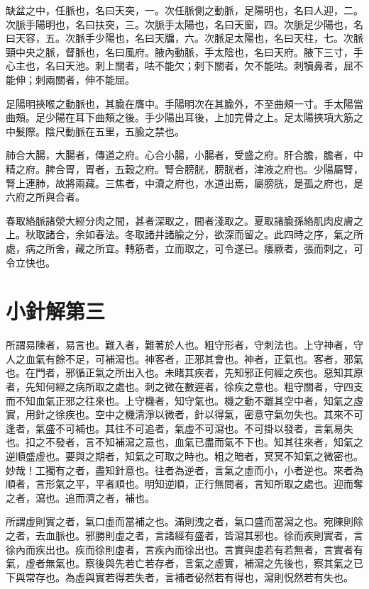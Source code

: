 缺盆之中，任脈也，名曰天突，一。次任脈側之動脈，足陽明也，名曰人迎，二。次脈手陽明也，名曰扶突，三。次脈手太陽也，名曰天窗，四。次脈足少陽也，名曰天容，五。次脈手少陽也，名曰天牖，六。次脈足太陽也，名曰天柱，七。次脈頸中央之脈，督脈也，名曰風府。腋內動脈，手太陰也，名曰天府。腋下三寸，手心主也，名曰天池。刺上關者，呿不能欠；刺下關者，欠不能呿。刺犢鼻者，屈不能伸；刺兩關者，伸不能屈。

足陽明挾喉之動脈也，其腧在膺中。手陽明次在其腧外，不至曲頰一寸。手太陽當曲頰。足少陽在耳下曲頰之後。手少陽出耳後，上加完骨之上。足太陽挾項大筋之中髮際。陰尺動脈在五里，五腧之禁也。

肺合大腸，大腸者，傳道之府。心合小腸，小腸者，受盛之府。肝合膽，膽者，中精之府。脾合胃，胃者，五穀之府。腎合膀胱，膀胱者，津液之府也。少陽屬腎，腎上連肺，故將兩藏。三焦者，中瀆之府也，水道出焉，屬膀胱，是孤之府也，是六府之所與合者。

春取絡脈諸滎大經分肉之間，甚者深取之，間者淺取之。夏取諸腧孫絡肌肉皮膚之上。秋取諸合，余如春法。冬取諸井諸腧之分，欲深而留之。此四時之序，氣之所處，病之所舍，藏之所宜。轉筋者，立而取之，可令遂已。痿厥者，張而刺之，可令立快也。



\section{小針解第三}

所謂易陳者，易言也。難入者，難著於人也。粗守形者，守刺法也。上守神者，守人之血氣有餘不足，可補瀉也。神客者，正邪其會也。神者，正氣也。客者，邪氣也。在門者，邪循正氣之所出入也。未睹其疾者，先知邪正何經之疾也。惡知其原者，先知何經之病所取之處也。刺之微在數遲者，徐疾之意也。粗守關者，守四支而不知血氣正邪之往來也。上守機者，知守氣也。機之動不離其空中者，知氣之虛實，用針之徐疾也。空中之機清淨以微者，針以得氣，密意守氣勿失也。其來不可逢者，氣盛不可補也。其往不可追者，氣虛不可瀉也。不可掛以發者，言氣易失也。扣之不發者，言不知補瀉之意也，血氣已盡而氣不下也。知其往來者，知氣之逆順盛虛也。要與之期者，知氣之可取之時也。粗之暗者，冥冥不知氣之微密也。妙哉！工獨有之者，盡知針意也。往者為逆者，言氣之虛而小，小者逆也。來者為順者，言形氣之平，平者順也。明知逆順，正行無問者，言知所取之處也。迎而奪之者，瀉也。追而濟之者，補也。

所謂虛則實之者，氣口虛而當補之也。滿則洩之者，氣口盛而當瀉之也。宛陳則除之者，去血脈也。邪勝則虛之者，言諸經有盛者，皆瀉其邪也。徐而疾則實者，言徐內而疾出也。疾而徐則虛者，言疾內而徐出也。言實與虛若有若無者，言實者有氣，虛者無氣也。察後與先若亡若存者，言氣之虛實，補瀉之先後也，察其氣之已下與常存也。為虛與實若得若失者，言補者佖然若有得也，瀉則怳然若有失也。

